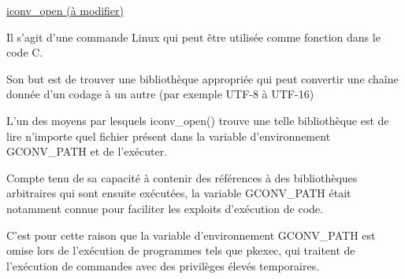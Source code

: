 \documentclass[12pt,a4paper]{article}
\begin{document}
\begin{flushleft}
            \item \underline{iconv\_open (à modifier) }
                \item Il s’agit d’une commande Linux qui peut être utilisée comme fonction dans le code C. 
                \item Son but est de trouver une bibliothèque appropriée qui peut convertir une chaîne donnée d’un codage à un autre (par exemple UTF-8 à UTF-16)
                \item L’un des moyens par lesquels iconv\_open() trouve une telle bibliothèque est de lire n’importe quel fichier présent dans la variable d’environnement GCONV\_PATH et de l’exécuter.
                \item Compte tenu de sa capacité à contenir des références à des bibliothèques arbitraires qui sont ensuite exécutées, la variable GCONV\_PATH était notamment connue pour faciliter les exploits d’exécution de code. 
                \item C’est pour cette raison que la variable d’environnement GCONV\_PATH est omise lors de l’exécution de programmes tels que pkexec, qui traitent de l’exécution de commandes avec des privilèges élevés temporaires.

\end{flushleft}
\end{document}
